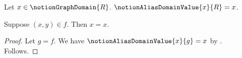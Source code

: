 

\begin{definition}\label{notion_alias_domain_value}
    Let $x\in\notionGraphDomain{R}$.
    $\notionAliasDomainValue{x}{R}=x$.
\end{definition}

\begin{proposition}\label{notion_alias_domain}
    Suppose $(x,y)\in f$.
    Then $x=x$.
\end{proposition}
\begin{proof}
    Let $g=f$.
    We have $\notionAliasDomainValue{x}{g}=x$
        by .
    Follows.
\end{proof}
